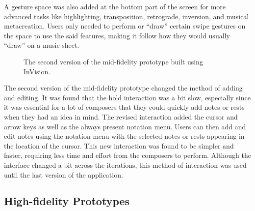 			A gesture space was also added at the bottom part of the screen for more advanced tasks like highlighting, transposition, retrograde, inversion, and musical metacreation. Users only needed to perform or ``draw'' certain swipe gestures on the space to use the said features, making it follow how they would usually ``draw'' on a music sheet. 

			\begin{figure}[H]
				\centering
			    \caption{The second version of the mid-fidelity prototype built using InVision.}
			    \label{fig:invision_v2}
			\end{figure} 

			The second version of the mid-fidelity prototype changed the method of adding and editing. It was found that the hold interaction was a bit slow, especially since it was essential for a lot of composers that they could quickly add notes or rests when they had an idea in mind. The revised interaction added the cursor and arrow keys as well as the always present notation menu. Users can then add and edit notes using the notation menu with the selected notes or rests appearing in the location of the cursor. This new interaction was found to be simpler and faster, requiring less time and effort from the composers to perform. Although the interface changed a bit across the iterations, this method of interaction was used until the last version of the application. 

		\subsection{High-fidelity Prototypes}
		\label{sec:high-fidelity-prototypes}

